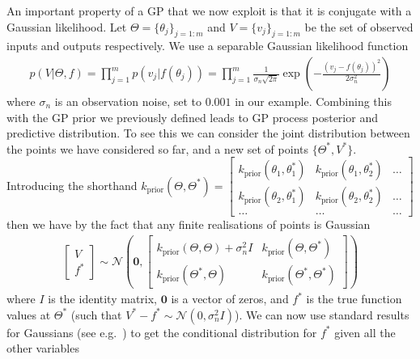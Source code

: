 An important property of a GP that we now exploit is that it is conjugate with a 
Gaussian likelihood.
Let ${\Theta} = \{\theta_j\}_{j=1:m}$ and ${V} = \{{v}_j\}_{j=1:m}$ 
be the set of observed inputs and outputs respectively.
We use a separable Gaussian likelihood function
\begin{align}
\label{eq:opt:GP-lik}
p({V}| {\Theta}, f) = \prod_{j=1}^{m}p({v}_j | f(\theta_j)) = \prod_{j=1}^{m}\frac{1}{\sigma_{n}\sqrt{2\pi}} \exp \left(-\frac{\left({v}_j-f(\theta_j)\right)^2}{2\sigma_n^2}\right)
\end{align}
where $\sigma_n$ is an observation noise, set to $0.001$ in our example.  Combining this with the GP prior
we previously defined leads to GP process posterior and predictive distribution.
To see this we can consider the joint distribution between the points we have
considered so far, and a new set of points $\{{\Theta}^*,{V}^*\}$.
Introducing the shorthand $k_{\text{prior}}({\Theta},{\Theta}^*) = \left[\begin{smallmatrix} k_{\text{prior}}(\theta_1,\theta_1^*) & k_{\text{prior}}(\theta_1,\theta_2^*) & \dots\\ k_{\text{prior}}(\theta_2,\theta_1^*) & k_{\text{prior}}(\theta_2,\theta_2^*) & \dots \\ \dots & \dots & \dots\end{smallmatrix}\right]$ then we have by the fact that
any finite realisations of points is Gaussian
\begin{align}
\label{eq:opt:GP-joint}
\left[\begin{matrix} 
V \\ f^*
\end{matrix}\right] \sim \mathcal{N} \left(\mathbf{0}, \left[
\begin{matrix}
k_{\text{prior}}({\Theta},{\Theta})+\sigma_n^2 I & k_{\text{prior}}({\Theta},{\Theta}^*) \\
k_{\text{prior}}({\Theta}^*,{\Theta}) & k_{\text{prior}}({\Theta}^*,{\Theta}^*)
\end{matrix}
\right]\right)
\end{align}
where $I$ is the identity matrix, $\mathbf{0}$ is a vector of zeros, and $f^*$ is the true
function values at ${\Theta}^*$ (such that $V^*-f^*\sim\mathcal{N}(0,\sigma_n^2 I)$).
We can now use standard results for Gaussians (see e.g.~\cite{petersen2008matrix}) to get
the conditional distribution for $f^*$ given all the other variables
